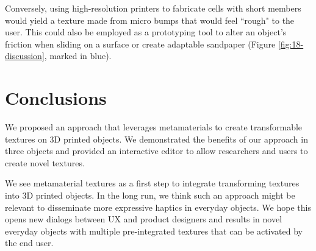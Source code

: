 Conversely, using high-resolution printers to fabricate cells with short members would yield a texture made from micro bumps that would feel ``rough" to the user. This could also be employed as a prototyping tool to alter an object’s friction when sliding on a surface or create adaptable sandpaper (Figure \ref{fig:18-discussion}, marked in blue).


\section{Conclusions}

We proposed an approach that leverages metamaterials to create transformable textures on 3D printed objects. We demonstrated the benefits of our approach in three objects and provided an interactive editor to allow researchers and users to create novel textures. 

We see metamaterial textures as a first step to integrate transforming textures into 3D printed objects. In the long run, we think such an approach might be relevant to disseminate more expressive haptics in everyday objects. We hope this opens new dialogs between UX and product designers and results in novel everyday objects with multiple pre-integrated textures that can be activated by the end user.



